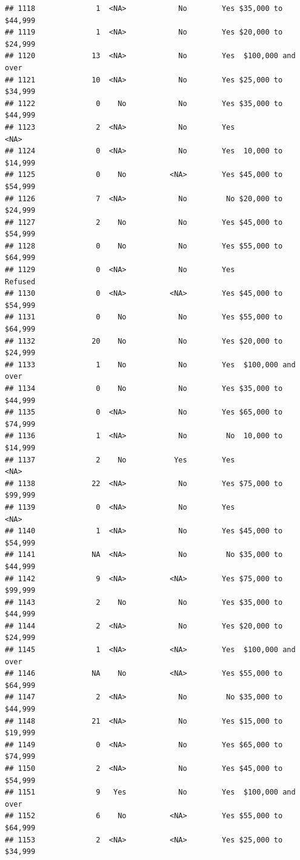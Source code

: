 \documentclass[man]{apa6}
\begin{document}
\begin{verbatim}
## 1118              1  <NA>            No        Yes $35,000 to $44,999
## 1119              1  <NA>            No        Yes $20,000 to $24,999
## 1120             13  <NA>            No        Yes  $100,000 and over
## 1121             10  <NA>            No        Yes $25,000 to $34,999
## 1122              0    No            No        Yes $35,000 to $44,999
## 1123              2  <NA>            No        Yes               <NA>
## 1124              0  <NA>            No        Yes  10,000 to $14,999
## 1125              0    No          <NA>        Yes $45,000 to $54,999
## 1126              7  <NA>            No         No $20,000 to $24,999
## 1127              2    No            No        Yes $45,000 to $54,999
## 1128              0    No            No        Yes $55,000 to $64,999
## 1129              0  <NA>            No        Yes            Refused
## 1130              0  <NA>          <NA>        Yes $45,000 to $54,999
## 1131              0    No            No        Yes $55,000 to $64,999
## 1132             20    No            No        Yes $20,000 to $24,999
## 1133              1    No            No        Yes  $100,000 and over
## 1134              0    No            No        Yes $35,000 to $44,999
## 1135              0  <NA>            No        Yes $65,000 to $74,999
## 1136              1  <NA>            No         No  10,000 to $14,999
## 1137              2    No           Yes        Yes               <NA>
## 1138             22  <NA>            No        Yes $75,000 to $99,999
## 1139              0  <NA>            No        Yes               <NA>
## 1140              1  <NA>            No        Yes $45,000 to $54,999
## 1141             NA  <NA>            No         No $35,000 to $44,999
## 1142              9  <NA>          <NA>        Yes $75,000 to $99,999
## 1143              2    No            No        Yes $35,000 to $44,999
## 1144              2  <NA>            No        Yes $20,000 to $24,999
## 1145              1  <NA>          <NA>        Yes  $100,000 and over
## 1146             NA    No          <NA>        Yes $55,000 to $64,999
## 1147              2  <NA>            No         No $35,000 to $44,999
## 1148             21  <NA>            No        Yes $15,000 to $19,999
## 1149              0  <NA>            No        Yes $65,000 to $74,999
## 1150              2  <NA>            No        Yes $45,000 to $54,999
## 1151              9   Yes            No        Yes  $100,000 and over
## 1152              6    No          <NA>        Yes $55,000 to $64,999
## 1153              2  <NA>          <NA>        Yes $25,000 to $34,999

\end{verbatim}
\end{document}
